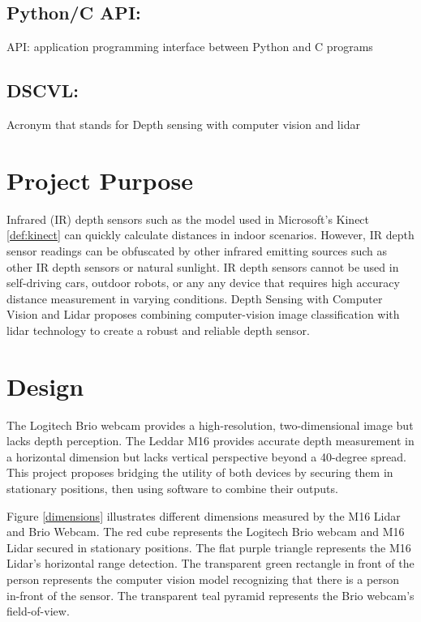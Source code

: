 \documentclass[onecolumn, draftclsnofoot,10pt, compsoc]{IEEEtran}
\begin{document}
\begin{singlespace}
			
		\subsection{Python/C API: }\label{def:API}\cite{Ctype}\par
		API: application programming interface between Python and C programs
		
		\subsection{DSCVL: }\label{def:DSCVL}
		Acronym that stands for Depth sensing with computer vision and lidar

		
	\section{Project Purpose}
		Infrared (IR) depth sensors such as the model used in Microsoft's Kinect \ref{def:kinect} can quickly calculate distances in indoor scenarios.
		However, IR depth sensor readings can be obfuscated by other infrared emitting sources such as other IR depth sensors or natural sunlight.
		IR depth sensors cannot be used in self-driving cars, outdoor robots, or any any device that requires high accuracy distance measurement in varying conditions.
		Depth Sensing with Computer Vision and Lidar proposes combining computer-vision image classification with lidar technology to create a robust and reliable depth sensor.

	\section{Design}
		The Logitech Brio webcam provides a high-resolution, two-dimensional image but lacks depth perception.
		The Leddar M16 provides accurate depth measurement in a horizontal dimension but lacks vertical perspective beyond a 40-degree spread.
		This project proposes bridging the utility of both devices by securing them in stationary positions, then using software to combine their outputs.		


		Figure \ref{dimensions} illustrates different dimensions measured by the M16 Lidar and Brio Webcam.
		The red cube represents the Logitech Brio webcam and M16 Lidar secured in stationary positions.
		The flat purple triangle represents the M16 Lidar's horizontal range detection.
		The transparent green rectangle in front of the person represents the computer vision model recognizing that there is a person in-front of the sensor.
		The transparent teal pyramid represents the Brio webcam's field-of-view.
		

\end{singlespace}
\end{document}
